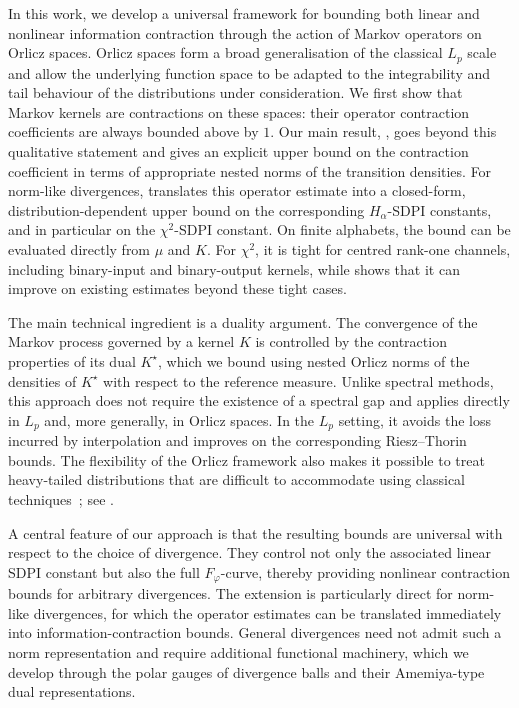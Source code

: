 \documentclass[11pt]{article}
\theoremstyle{plain}
\theoremstyle{remark}
\begin{document}
In this work, we develop a universal framework for bounding both linear and nonlinear information contraction through the action of Markov operators on Orlicz spaces. Orlicz spaces form a broad generalisation of the classical $L_p$ scale and allow the underlying function space to be adapted to the integrability and tail behaviour of the distributions under consideration. We first show that Markov kernels are contractions on these spaces: their operator contraction coefficients are always bounded above by $1$. Our main result, , goes beyond this qualitative statement and gives an explicit upper bound on the contraction coefficient in terms of appropriate nested norms of the transition densities. For norm-like divergences,  translates this operator estimate into a closed-form, distribution-dependent upper bound on the corresponding $H_\alpha$-SDPI constants, and in particular on the $\chi^2$-SDPI constant. On finite alphabets, the bound can be evaluated directly from $\mu$ and $K$. For $\chi^2$, it is tight for centred rank-one channels, including binary-input and binary-output kernels, while  shows that it can improve on existing estimates beyond these tight cases.

The main technical ingredient is a duality argument. The convergence of the Markov process governed by a kernel $K$ is controlled by the contraction properties of its dual $K^\star$, which we bound using nested Orlicz norms of the densities of $K^\star$ with respect to the reference measure. Unlike spectral methods, this approach does not require the existence of a spectral gap and applies directly in $L_p$ and, more generally, in Orlicz spaces. In the $L_p$ setting, it avoids the loss incurred by interpolation and improves on the corresponding Riesz--Thorin bounds. The flexibility of the Orlicz framework also makes it possible to treat heavy-tailed distributions that are difficult to accommodate using classical techniques~\cite{polynomialMC,heavyTailedMCMC}; see .

A central feature of our approach is that the resulting bounds are universal with respect to the choice of divergence. They control not only the associated linear SDPI constant but also the full $F_\varphi$-curve, thereby providing nonlinear contraction bounds for arbitrary divergences. The extension is particularly direct for norm-like divergences, for which the operator estimates can be translated immediately into information-contraction bounds. General divergences need not admit such a norm representation and require additional functional machinery, which we develop through the polar gauges of divergence balls and their Amemiya-type dual representations.
\end{document}
